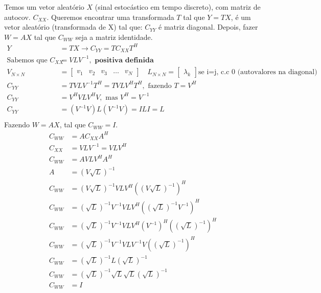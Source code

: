 \documentclass{article}
\begin{document}
Temos um vetor aleatório $X$ (sinal estocástico em tempo discreto), com matriz de autocov.
$C_{XX}$. Queremos encontrar uma transformada $T$ tal que $Y = TX$, é um vetor aleatório
(transformada de X) tal que: $C_{YY}$ é matriz diagonal. Depois, fazer $W = AX$ tal que $C_{WW}$
seja a matriz identidade.
\begin{align*}
    Y &= TX \to C_{YY} = T C_{XX} T^H \\
    \text{Sabemos que } C_{XX} &= VLV^{-1}, \textbf{ positiva definida} \\
    V_{N \times N} &=
    \begin{bmatrix}
        v_1 & v_2 & v_3 & \ldots & v_N
    \end{bmatrix} \quad
    L_{N \times N} =
    \begin{bmatrix}
        \lambda_k
    \end{bmatrix} \text{se i=j, c.c 0 (autovalores na diagonal)} \\
    C_{YY} &= T V L V^{-1} T^H = T V L V^H T^H, \text{ fazendo } T = V^H \\
    C_{YY} &= V^H V L V^H V, \text{ mas } V^H = V^{-1} \\
    C_{YY} &= (V^{-1}V) L (V^{-1}V) = I L I = L \\
\end{align*}
Fazendo $W = AX$, tal que $C_{WW} = I$.
\begin{align*}
    C_{WW} &= A C_{XX} A^H \\
    C_{XX} &= VLV^{-1} = VLV^H \\
    C_{WW} &= AVLV^HA^H \\
    A &= (V \sqrt{L})^{-1} \\
    C_{WW} &= (V\sqrt{L})^{-1}VLV^H((V\sqrt{L})^{-1})^H \\
    C_{WW} &= (\sqrt{L})^{-1} V^{-1} V L V^H ((\sqrt{L})^{-1} V^{-1})^H \\
    C_{WW} &= (\sqrt{L})^{-1} V^{-1} V L V^H (V^{-1})^H ((\sqrt{L})^{-1})^H \\
    C_{WW} &= (\sqrt{L})^{-1} V^{-1} V L V^{-1} V ((\sqrt{L})^{-1})^H \\
    C_{WW} &= (\sqrt{L})^{-1} L (\sqrt{L})^{-1} \\
    C_{WW} &= (\sqrt{L})^{-1} \sqrt{L}\sqrt{L} (\sqrt{L})^{-1} \\
    C_{WW} &= I
\end{align*}
\end{document}
